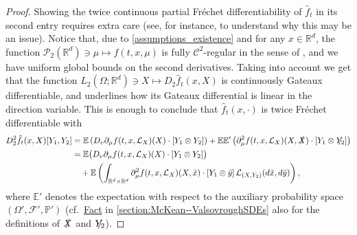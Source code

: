 \documentclass[10pt, a4paper]{article} %
\newcommand{\R}{\mathbb{R}}
\newcommand{\E}{\mathbb{E}}
\theoremstyle{definition}
\theoremstyle{plain}
\begin{document}
\begin{proof}
    Showing the twice continuous partial Fréchet differentiability of $\hat{f}_t$ in its second entry requires extra care (see, for instance, \cite[Remark 5.80]{CARMONADELARUE_volumeI} to understand why this may be an issue). Notice that, due to \cref{assumptions_existence} and for any $x \in \R^d$, the function $\mathcal{P}_2(\R^d) \ni \mu \mapsto f(t, x,\mu)$ is fully $\mathcal{C}^2$-regular in the sense of \cite[Section 5.6.2, p. 464]{CARMONADELARUE_volumeI}, and we have uniform global bounds on the second derivatives. Taking into account \cite[Proposition 5.85]{CARMONADELARUE_volumeI} we get that the function $L_2(\Omega;\R^d) \ni X \mapsto D_2 \hat{f}_t(x,X)$ is continuously Gateaux differentiable, and \cite[Remark 5.86]{CARMONADELARUE_volumeI} underlines how its Gateaux differential is linear in the direction variable. This is enough to conclude that $\hat{f}_t(x,\cdot)$ is twice Fréchet differentiable with 
    \begin{align*}
        D^2_2 \hat f_t(x,X)[Y_1,Y_2] &= \E\left(D_v\partial_\mu f(t,x,\mathcal L_X)(X)\cdot [Y_1\otimes Y_2]\right) + \E\E'\left(\partial_\mu^2 f(t,x,\mathcal L_X)(X,\slashed X)\cdot [Y_1\otimes \slashed{Y_2}] \right) \\
        &= \E\big(D_v \partial_\mu f(t,x,\mathcal{L}_X)(X)\cdot [Y_1 \otimes Y_2]\big)\\
        & \quad + \E\left(\int_{\R^d \times \R^d}\partial^2_\mu f(t,x,\mathcal{L}_X)(X,\tilde x)\cdot [Y_1 \otimes \tilde y]\,\mathcal{L}_{(X,Y_2)}(d\tilde x,d\tilde y)\right),
    \end{align*}
    where $\E'$ denotes the expectation with respect to the auxiliary probability space $(\Omega',\mathcal{F}',\mathbb{P}')$ (cf.\ \hyperref[fact]{Fact} in \cref{section:McKean--ValsovroughSDEs} also for the definitions of $\slashed{X}$ and $\slashed{Y_2}$). 

\end{proof}
\end{document}

